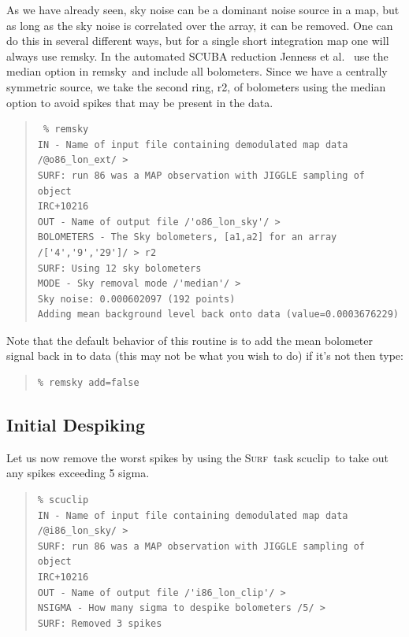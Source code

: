 \documentclass[twoside,11pt]{article}
\newenvironment{myquote}{\begin{quote}\begin{small}}{\end{small}\end{quote}}
\newcommand{\surf}{\xref{\textsc{Surf}}{sun216}{}}
\newcommand{\task}[1]{\textsf{#1}}
\newcommand{\remsky}{\xref{\task{remsky}}{sun216}{REMSKY}}
\newcommand{\scuclip}{\xref{\task{scuclip}}{sun216}{SCUCLIP}}
\newcommand{\xref}[3]{#1}
\newcommand{\xlabel}[1]{}
\renewcommand{\_}{\texttt{\symbol{95}}}
\begin{document}
As we have already seen, sky noise can be a dominant noise source in a
map, but as long as the sky noise is correlated over the array, it can
be removed.  One can do this in several different ways, but for a
single short integration map one will always use \remsky.  In the
automated SCUBA reduction Jenness et al.\  \cite{Jenness01} use the
median option in \remsky\ and include all bolometers.  Since we have a
centrally symmetric source, we take the second ring, r2, of bolometers
using the median option to avoid spikes that may be present in the
data.


\begin{myquote}
\begin{verbatim}
 % remsky
IN - Name of input file containing demodulated map data
/@o86_lon_ext/ >
SURF: run 86 was a MAP observation with JIGGLE sampling of object
IRC+10216
OUT - Name of output file /'o86_lon_sky'/ >
BOLOMETERS - The Sky bolometers, [a1,a2] for an array
/['4','9','29']/ > r2
SURF: Using 12 sky bolometers
MODE - Sky removal mode /'median'/ >
Sky noise: 0.000602097 (192 points)
Adding mean background level back onto data (value=0.0003676229)
\end{verbatim}
\end{myquote}

Note that the default behavior of this routine is to add the mean bolometer
signal back in to data (this may not be what you wish to do) if it's not then
type:

\begin{myquote}
\begin{verbatim}
% remsky add=false
\end{verbatim}
\end{myquote}


\subsection{\xlabel{InitDespiking}Initial Despiking}

Let us now remove the worst spikes by using the \surf\ task \scuclip\
to take out any spikes exceeding 5 sigma.

\begin{myquote}
\begin{verbatim}
% scuclip
IN - Name of input file containing demodulated map data
/@i86_lon_sky/ >
SURF: run 86 was a MAP observation with JIGGLE sampling of object
IRC+10216
OUT - Name of output file /'i86_lon_clip'/ >
NSIGMA - How many sigma to despike bolometers /5/ >
SURF: Removed 3 spikes
\end{verbatim}
\end{myquote}
\end{document}
